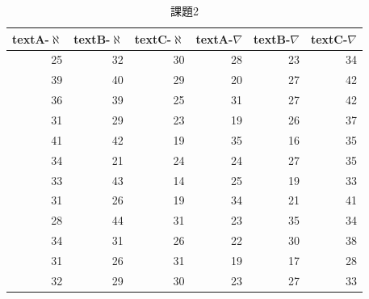 \begin{table}[ht]
	\centering
	\caption{課題2}
	\begin{tabular}{rrrrrr}
		\hline
		textA-$\aleph$ & textB-$\aleph$ & textC-$\aleph$ & textA-$\nabla$ & textB-$\nabla$ & textC-$\nabla$ \\
		\hline
		25             & 32             & 30             & 28             & 23             & 34             \\
		39             & 40             & 29             & 20             & 27             & 42             \\
		36             & 39             & 25             & 31             & 27             & 42             \\
		31             & 29             & 23             & 19             & 26             & 37             \\
		41             & 42             & 19             & 35             & 16             & 35             \\
		34             & 21             & 24             & 24             & 27             & 35             \\
		33             & 43             & 14             & 25             & 19             & 33             \\
		31             & 26             & 19             & 34             & 21             & 41             \\
		28             & 44             & 31             & 23             & 35             & 34             \\
		34             & 31             & 26             & 22             & 30             & 38             \\
		31             & 26             & 31             & 19             & 17             & 28             \\
		32             & 29             & 30             & 23             & 27             & 33             \\
		\hline
	\end{tabular}
	\label{L23::exe2}
\end{table}
